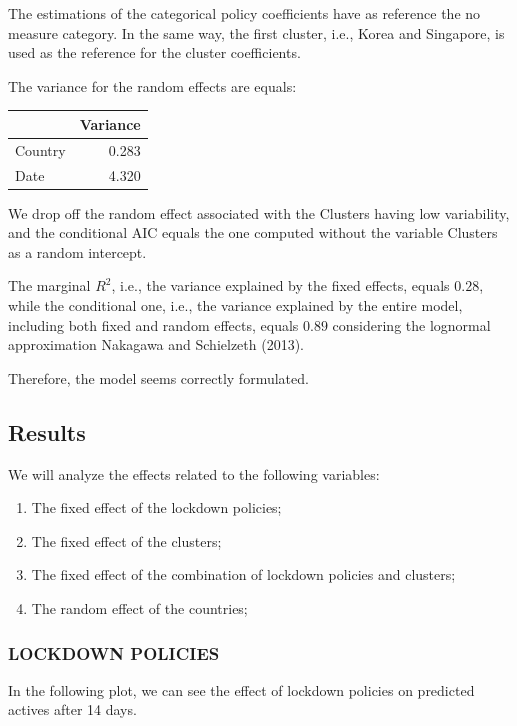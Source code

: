 \documentclass[
  6pt,
]{article}
\begin{document}
The estimations of the categorical policy coefficients have as reference
the no measure category. In the same way, the first cluster, i.e., Korea
and Singapore, is used as the reference for the cluster coefficients.

The variance for the random effects are equals:

\begin{longtable}[]{@{}lr@{}}
\toprule
& Variance\tabularnewline
\midrule
\endhead
Country & 0.283\tabularnewline
Date & 4.320\tabularnewline
\bottomrule
\end{longtable}

We drop off the random effect associated with the Clusters having low
variability, and the conditional AIC equals the one computed without the
variable Clusters as a random intercept.

The marginal \(R^2\), i.e., the variance explained by the fixed effects,
equals \(0.28\), while the conditional one, i.e., the variance explained
by the entire model, including both fixed and random effects, equals
\(0.89\) considering the lognormal approximation Nakagawa and Schielzeth
(2013).

Therefore, the model seems correctly formulated.

\hypertarget{results}{%
\subsection{Results}\label{results}}

We will analyze the effects related to the following variables:

\begin{enumerate}
\def\labelenumi{\arabic{enumi}.}
\item
  The fixed effect of the lockdown policies;
\item
  The fixed effect of the clusters;
\item
  The fixed effect of the combination of lockdown policies and clusters;
\item
  The random effect of the countries;
\end{enumerate}

\hypertarget{lockdown-policies}{%
\subsubsection{LOCKDOWN POLICIES}\label{lockdown-policies}}

In the following plot, we can see the effect of lockdown policies on
predicted actives after 14 days.
\end{document}
